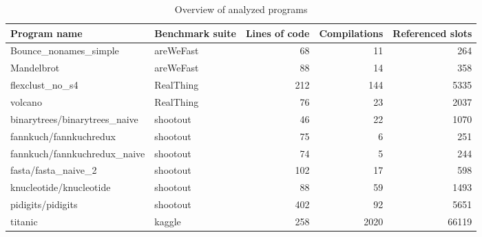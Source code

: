 \begin{table}[ht]
	\centering
	\begin{adjustwidth}{-2cm}{-2cm}
		\begin{tabular}{l l r r r}
			\hline
			\textbf{Program name}          & \textbf{Benchmark suite} & \textbf{Lines of code} & \textbf{Compilations} & \textbf{Referenced slots} \\
			\hline
			Bounce\_nonames\_simple        & areWeFast                & 68                     & 11                    & 264                       \\
			Mandelbrot                     & areWeFast                & 88                     & 14                    & 358                       \\
			flexclust\_no\_s4              & RealThing                & 212                    & 144                   & 5335                      \\
			volcano                        & RealThing                & 76                     & 23                    & 2037                      \\
			binarytrees/binarytrees\_naive & shootout                 & 46                     & 22                    & 1070                      \\
			fannkuch/fannkuchredux         & shootout                 & 75                     & 6                     & 251                       \\
			fannkuch/fannkuchredux\_naive  & shootout                 & 74                     & 5                     & 244                       \\
			fasta/fasta\_naive\_2          & shootout                 & 102                    & 17                    & 598                       \\
			knucleotide/knucleotide        & shootout                 & 88                     & 59                    & 1493                      \\
			pidigits/pidigits              & shootout                 & 402                    & 92                    & 5651                      \\
			titanic                        & kaggle                   & 258                    & 2020                  & 66119                     \\
			\hline
		\end{tabular}
	\end{adjustwidth}
	\caption{Overview of analyzed programs}\label{tbl:analysis-overview}
\end{table}

